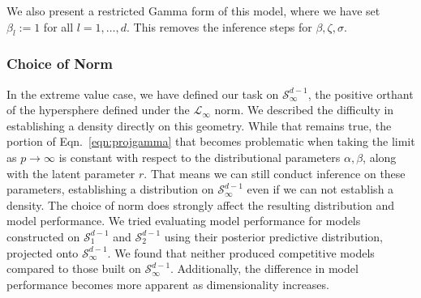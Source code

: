 We also present a restricted Gamma form of this model, where we have set $\beta_l := 1$ for all
  $l = 1,\ldots,d$.  This removes the inference steps for $\beta,\zeta,\sigma$.


\subsubsection{Choice of Norm}
In the extreme value case, we have defined our task on $\mathcal{S}_{\infty}^{d-1}$, the positive orthant
  of the hypersphere defined under the $\mathcal{L}_{\infty}$ norm.  We described the difficulty in
  establishing a density directly on this geometry.  While that remains true, the portion of
  Eqn.~\ref{eqn:projgamma} that becomes problematic when taking the limit as $p\to\infty$ is constant
  with respect to the distributional parameters $\alpha,\beta$, along with the latent parameter $r$.
  That means we can still conduct inference on these parameters, establishing a distribution on
  $\mathcal{S}_{\infty}^{d-1}$ even if we can not establish a density.   The choice of norm does
  strongly affect the resulting distribution and model performance.  We tried evaluating model performance
  for models constructed on $\mathcal{S}_1^{d-1}$ and $\mathcal{S}_2^{d-1}$ using their posterior
  predictive distribution, projected onto $\mathcal{S}_{\infty}^{d-1}$.  We found that neither produced
  competitive models compared to those built on $\mathcal{S}_{\infty}^{d-1}$.  Additionally, the
  difference in model performance becomes more apparent as dimensionality increases.





